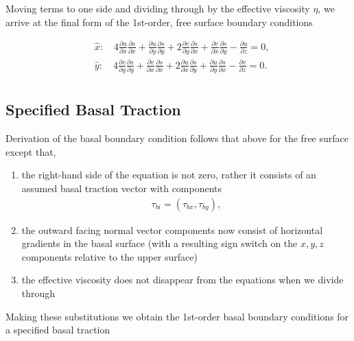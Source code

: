 Moving terms to one side and dividing through by the effective viscosity \textit{\(\eta{}\)}, we arrive at the final form of the 1st-order, free surface boundary conditions

\begin{align*}
   {} & \hat{x}:\quad 4\frac{\partial u}{\partial x}\frac{\partial s}{\partial x}+\frac{\partial u}{\partial y}\frac{\partial s}{\partial y}+2\frac{\partial v}{\partial y}\frac{\partial s}{\partial x}+\frac{\partial v}{\partial x}\frac{\partial s}{\partial y}-\frac{\partial u}{\partial z}=0,  \\
   {} & \hat{y}:\quad 4\frac{\partial v}{\partial y}\frac{\partial s}{\partial y}+\frac{\partial v}{\partial x}\frac{\partial s}{\partial x}+2\frac{\partial u}{\partial x}\frac{\partial s}{\partial y}+\frac{\partial u}{\partial y}\frac{\partial s}{\partial x}-\frac{\partial v}{\partial z}=0.  \\
\end{align*}

\subsection{Specified Basal Traction}
Derivation of the basal boundary condition follows that above for the free surface except that,
\begin{enumerate}

\item the right-hand side of the equation is not zero, rather it consists of an assumed basal traction vector with components 
\begin{align*}
\tau_{bi} = \left( \tau _{bx},\tau _{by} \right),
\end{align*}

\item the outward facing normal vector components now consist of horizontal gradients in the basal surface (with a resulting sign switch on the $x,y,z$ components relative to the upper surface)

\item the effective viscosity does not disappear from the equations when we divide through
\end{enumerate}

Making these substitutions we obtain the 1st-order basal boundary conditions for a specified basal traction

